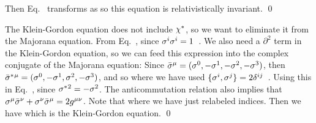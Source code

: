 {	Then Eq.~ transforms as
	so this equation is relativistically invariant. \qed
	
	The Klein-Gordon equation does not include $\chi^*$, so we want to eliminate it from the Majorana equation.  From Eq.~,
	since $\sigma^i \sigma^i = 1$~\cite[p.~164]{Sakurai}.  We also need a $\partial^2$ term in the Klein-Gordon equation, so we can feed this expression into the complex conjugate of the Majorana equation:
	Since $\bar{\sigma}^\mu = ( \sigma^0, -\sigma^1, -\sigma^2, -\sigma^3 )$, then $\bar{\sigma}^*{}^\mu = ( \sigma^0, -\sigma^1, \sigma^2, -\sigma^3 )$, and so
	where we have used $\{ \sigma^i, \sigma^j \} = 2 \delta^{i j}$~\cite[p.~165]{Sakurai}.  Using this in Eq.~,
	since $\sigma^*{}^2 = -\sigma^2$.  The anticommutation relation also implies that $\sigma^\mu \bar{\sigma}^\nu + \sigma^\nu \bar{\sigma}^\mu = 2 g^{\mu \nu}$.  Note that
	where we have just relabeled indices.  Then we have
	which is the Klein-Gordon equation. \qed
}



